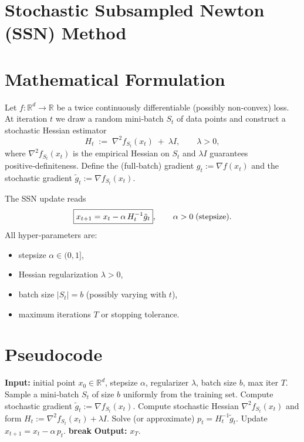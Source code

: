 \documentclass{article}
\newcommand{\R}{\mathbb{R}}
\begin{document}
\section*{Stochastic Subsampled Newton (SSN) Method}

\section*{Mathematical Formulation}
Let $f:\R^{d}\rightarrow\R$ be a twice continuously differentiable (possibly non‑convex) loss.  
At iteration $t$ we draw a random mini‑batch $S_t$ of data points and construct a stochastic
Hessian estimator 
\[
H_t\;:=\;\nabla^{2} f_{S_t}(x_t)\;+\;\lambda I,
\qquad \lambda>0,
\]
where $\nabla^{2} f_{S_t}(x_t)$ is the empirical Hessian on $S_t$ and $\lambda I$ guarantees
positive‑definiteness.  
Define the (full‑batch) gradient $g_t:=\nabla f(x_t)$ and the stochastic gradient 
$\tilde g_t:=\nabla f_{S_t}(x_t)$.  

The SSN update reads
\begin{equation}
\boxed{%
x_{t+1}=x_{t}-\alpha\, H_t^{-1}\tilde g_t},
\qquad \alpha>0\;\text{(stepsize)}.
\label{eq:update}
\end{equation}
All hyper‑parameters are:
\begin{itemize}[nosep]
  \item stepsize $\alpha\in(0,1]$,
  \item Hessian regularization $\lambda>0$,
  \item batch size $|S_t|=b$ (possibly varying with $t$),
  \item maximum iterations $T$ or stopping tolerance.
\end{itemize}

\section*{Pseudocode}
\begin{algorithm}[H]
\caption{Stochastic Subsampled Newton (SSN)}
\begin{algorithmic}[1]
\STATE \textbf{Input:} initial point $x_0\in\R^{d}$, stepsize $\alpha$, regularizer $\lambda$, batch size $b$, max iter $T$.
    \STATE Sample a mini‑batch $S_t$ of size $b$ uniformly from the training set.
    \STATE Compute stochastic gradient $\tilde g_t:=\nabla f_{S_t}(x_t)$.
    \STATE Compute stochastic Hessian $\nabla^{2} f_{S_t}(x_t)$ and form $H_t:=\nabla^{2} f_{S_t}(x_t)+\lambda I$.
    \STATE Solve (or approximate) $p_t = H_t^{-1}\tilde g_t$.
    \STATE Update $x_{t+1}=x_t-\alpha\,p_t$.
        \STATE \textbf{break}
    \ENDIF
\ENDFOR
\STATE \textbf{Output:} $x_T$.
\end{algorithmic}
\end{algorithm}
\end{document}
